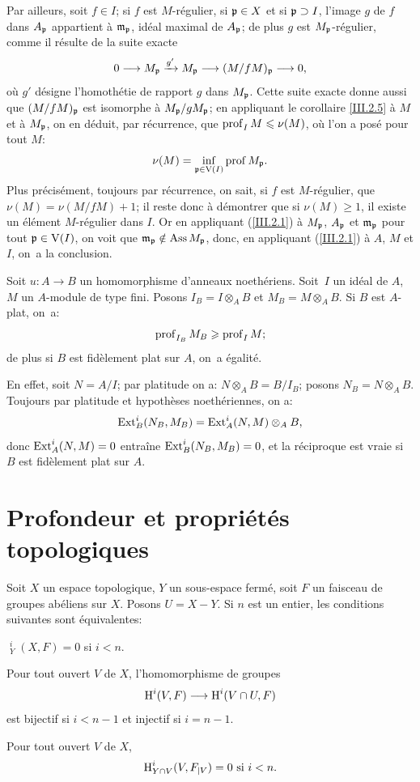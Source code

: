 Par ailleurs, soit $f\in I$; si $f$ est $M$-r\'egulier, si $\mathfrak{p}\in X$ et si $\mathfrak{p}\supset I$, l'image $g$ de $f$ dans $A_{\mathfrak{p}}$ appartient \`a $\mathfrak{m}_{\mathfrak{p}}$, id\'eal maximal de $A_{\mathfrak{p}}$; de plus $g$ est $M_{\mathfrak{p}}$-r\'egulier, comme il r\'esulte de la suite exacte
\begin{equation} \label{eq:III.2.3} 0 \to M_\pp \lto{g'} M_\pp \to (M/fM)_\pp \to 0,
\end{equation}
o\`u $g'$ d\'esigne l'homoth\'etie de rapport $g$ dans $M_{\mathfrak{p}}$. Cette suite exacte donne aussi que $(M/fM)_{\mathfrak{p}}$ est isomorphe \`a $M_{\mathfrak{p}}/gM_{\mathfrak{p}}$; en appliquant le corollaire \ref{III.2.5} \`a $M$ et \`a $M_{\mathfrak{p}}$, on en d\'eduit, par r\'ecurrence, que $\operatorname{prof}_I M\leqslant \nu(M)$, o\`u l'on a pos\'e pour tout $M$:
\[
\nu(M)=\inf_{\mathfrak{p}\in\operatorname{V}(I)} \operatorname{prof} M_{\mathfrak{p}}.
\]
Plus pr\'ecis\'ement, toujours par r\'ecurrence, on sait, si $f$ est $M$-r\'egulier, que $\nu(M)= \nu(M/fM)+1$; il reste donc \`a d\'emontrer que si $\nu(M)\geq 1$, il existe un \'el\'ement $M$-r\'egulier dans $I$. Or en appliquant (\ref{III.2.1}) \`a $M_{\mathfrak{p}}$, $A_{\mathfrak{p}}$ et $\mathfrak{m}_{\mathfrak{p}}$ pour tout $\mathfrak{p}\in \operatorname{V}(I)$, on voit que $\mathfrak{m}_{\mathfrak{p}} \notin \operatorname{Ass} M_{\mathfrak{p}}$, donc, en appliquant (\ref{III.2.1}) \`a $A$, $M$ et $I$, on~a la conclusion.

\enlargethispage{\baselineskip}%
\begin{proposition} \label{III.2.11}
Soit $u:A\to B$ un homomorphisme d'anneaux noeth\'eriens. Soit~$I$ un id\'eal de $A$, $M$ un $A$-module de type fini. Posons $I_B=I\otimes_A B$ et $M_B=M\otimes_A B$. Si $B$ est $A$-plat, on~a:
\[
\operatorname{prof}_{I_B} M_B \geqslant \operatorname{prof}_I M;
\]
de plus si $B$ est fid\`element plat sur $A$, on~a \'egalit\'e.
\end{proposition}

En effet, soit $N=A/I$; par platitude on a: $N\otimes_A B=B/I_B$; posons $N_B=N\otimes_A B$. Toujours par platitude et hypoth\`eses noeth\'eriennes, on a:
\[
\operatorname{Ext}_B^i (N_B, M_B) = \operatorname{Ext}_A^i(N, M)\otimes_A B,
\]
donc $\operatorname{Ext}_A^i(N, M) = 0 $ entra\^ine $\operatorname{Ext}_B^i(N_B, M_B)=0$, et la r\'eciproque est vraie si $B$ est fid\`element plat sur $A$.

\section{Profondeur et propri\'et\'es topologiques} \label{III.3}

\begin{lemme} \label{III.3.1}
Soit $X$ un espace topologique, $Y$ un sous-espace ferm\'e, soit $F$ un faisceau de groupes ab\'eliens sur $X$. Posons $U=X- Y$. Si $n$ est un entier, les conditions suivantes sont \'equivalentes:
\begin{enumeratei}
\item
$\mathop{\underline{\mathrm{H}}}\nolimits_Y^i (X, F)=0$ si $i<n$.
\item
Pour tout ouvert $V$ de $X$, l'homomorphisme de groupes
\[
\H^i(V, F) \to \H^i(V\cap U, F)
\]
est bijectif si $i<n-1$ et injectif si $i=n-1$.

\item
Pour tout ouvert $V$ de $X$,
\[
\operatorname{H}_{Y\cap V}^i(V, F_{\mid V})=0 \text{ si } i<n.
\]
\end{enumeratei}
\end{lemme}

